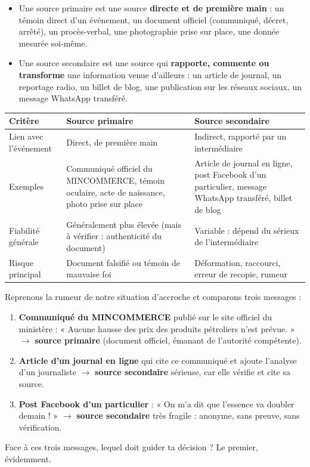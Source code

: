 \documentclass[11pt]{article}
\newcommand{\cle}[1]{{\popxbold\color{popdark}#1}}
\begin{document}
\begin{definition}
\begin{itemize}
\item Une \cle{source primaire} est une source \textbf{directe et de première main} : un témoin direct d'un événement, un document officiel (communiqué, décret, arrêté), un procès-verbal, une photographie prise sur place, une donnée mesurée soi-même.
\item Une \cle{source secondaire} est une source qui \textbf{rapporte, commente ou transforme} une information venue d'ailleurs : un article de journal, un reportage radio, un billet de blog, une publication sur les réseaux sociaux, un message WhatsApp transféré.
\end{itemize}
\end{definition}

\begin{center}
\begin{tabularx}{\linewidth}{|l|X|X|}
\hline
\rowcolor{popblueL}
\textbf{Critère} & \textbf{Source primaire} & \textbf{Source secondaire} \\
\hline
Lien avec l'événement & Direct, de première main & Indirect, rapporté par un intermédiaire \\
\hline
Exemples & Communiqué officiel du MINCOMMERCE, témoin oculaire, acte de naissance, photo prise sur place & Article de journal en ligne, post Facebook d'un particulier, message WhatsApp transféré, billet de blog \\
\hline
Fiabilité générale & Généralement plus élevée (mais à vérifier : authenticité du document) & Variable : dépend du sérieux de l'intermédiaire \\
\hline
Risque principal & Document falsifié ou témoin de mauvaise foi & Déformation, raccourci, erreur de recopie, rumeur \\
\hline
\end{tabularx}
\end{center}

\begin{exemplebox}
Reprenons la rumeur de notre situation d'accroche et comparons trois messages :
\begin{enumerate}
\item \textbf{Communiqué du MINCOMMERCE} publié sur le site officiel du ministère : « Aucune hausse des prix des produits pétroliers n'est prévue. » $\rightarrow$ \textbf{source primaire} (document officiel, émanant de l'autorité compétente).
\item \textbf{Article d'un journal en ligne} qui cite ce communiqué et ajoute l'analyse d'un journaliste $\rightarrow$ \textbf{source secondaire} sérieuse, car elle vérifie et cite sa source.
\item \textbf{Post Facebook d'un particulier} : « On m'a dit que l'essence va doubler demain ! » $\rightarrow$ \textbf{source secondaire} très fragile : anonyme, sans preuve, sans vérification.
\end{enumerate}
Face à ces trois messages, lequel doit guider ta décision ? Le premier, évidemment.
\end{exemplebox}
\end{document}
